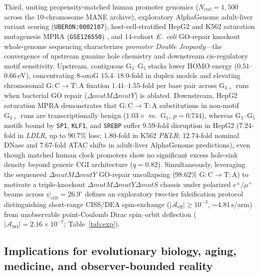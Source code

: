 \documentclass[10pt,letterpaper]{article}
\theoremstyle{plain}
\theoremstyle{definition}
\newcommand{\oxog}{\text{8-oxoG}}
\begin{document}
Third, uniting propensity-matched human promoter genomics ($N_{\mathrm{ctrl}} = 1{,}500$ across the $10$-chromosome MANE archive), exploratory AlphaGenome adult-liver variant scoring (\texttt{UBERON:0002107}), host-cell-stratified HepG2 and K562 saturation mutagenesis MPRA (\texttt{GSE126550}) \cite{kircher2019natcommun}, and $14$-cohort \emph{E.\ coli} GO-repair knockout whole-genome sequencing \cite{foster2015pnas,garushyants2024gbe} characterizes \emph{promoter Double Jeopardy}---the convergence of upstream guanine hole chemistry and downstream cis-regulatory motif sensitivity. Upstream, contiguous $\mathrm{G}_3$--$\mathrm{G}_5$ stacks lower HOMO energy ($0.51$--$0.66\,\mathrm{eV}$), concentrating $\oxog$ $15.4$--$18.0$-fold in duplex models and elevating chromosomal $\mathrm{G{:}C \to T{:}A}$ fixation $1.41$--$1.55$-fold per base pair across $\mathrm{G}_{3+}$ runs when bacterial GO repair ($\Delta\textit{mutM}\Delta\textit{mutY}$) is ablated. Downstream, HepG2 saturation MPRA demonstrates that $\mathrm{G{:}C \to T{:}A}$ substitutions in non-motif $\mathrm{G}_{3+}$ runs are transcriptionally benign ($1.03\times$ vs.\ $\mathrm{G}_1$, $p = 0.744$), whereas $\mathrm{G}_3$--$\mathrm{G}_5$ motifs bound by \texttt{SP1}, \texttt{KLF1}, and \texttt{SREBP} suffer $9.59$-fold disruption in HepG2 ($7.24$-fold in \emph{LDLR}, up to $90.7\%$ loss; $1.80$-fold in K562 \emph{PKLR}; $12.74$-fold nominal DNase and $7.67$-fold ATAC shifts in adult-liver AlphaGenome predictions), even though matched human clock promoters show no significant excess hole-sink density beyond generic CGI architecture ($q = 0.82$). Simultaneously, leveraging the sequenced $\Delta\textit{mutM}\Delta\textit{mutY}$ GO-repair uncollapsing ($98.62\%$ $\mathrm{G{:}C \to T{:}A}$) to motivate a triple-knockout $\Delta\textit{mutM}\Delta\textit{mutY}\Delta\textit{mutS}$ chassis under polarized $e^\pm/\mu^+$ beams across $\psi_{\mathrm{crit}} = 26.9^\circ$ defines an exploratory two-tier falsification protocol distinguishing short-range CISS/DEA spin-exchange ($|\mathcal{A}_{\mathrm{eff}}| \ge 10^{-3}$, $\sim 4.81\,\mathrm{s}$/arm) from unobservable point-Coulomb Dirac spin--orbit deflection ($|\mathcal{A}_{\mathrm{SO}}| = 2.16 \times 10^{-7}$; Table~\ref{tab:exp}).

\subsection*{Implications for evolutionary biology, aging, medicine, and observer-bounded reality}
\end{document}
